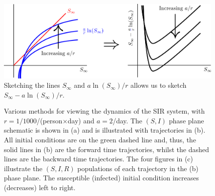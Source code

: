 \begin{figure}[ph!!!tb]
\centering
\includegraphics[width=\textwidth]{../Pictures/Infection_schematic.png}
\caption{Sketching the lines $S_\infty$ and $a\ln(S_\infty)/r$ allows us to sketch $S_\infty-a\ln(S_\infty)/r$.\label{Infection_schematic}}
\end{figure}
\begin{figure}[ph!!!tb]
\centering
{}
\caption{Various methods for viewing the dynamics of the SIR system,  with $r=1/1000$/(person$\times$day) and $a=2$/day. The $(S,I)$ phase plane schematic is shown in (a) and is illustrated with trajectories in (b). All initial conditions are on the green dashed line and, thus, the solid lines in (b) are the forward time trajectories, whilst the dashed lines are the backward time trajectories. The four figures in (c) illustrate the $(S,I,R)$ populations of each trajectory in the (b) phase plane. The susceptible (infected) initial condition increases (decreases) left to right.}
\end{figure}

